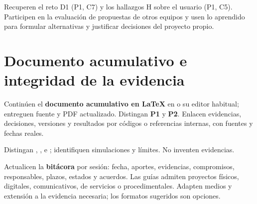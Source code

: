 Recuperen el reto D1 (P1, C7) y los hallazgos H sobre el usuario (P1, C5). Participen en la evaluación de propuestas de otros equipos y usen lo aprendido para formular alternativas y justificar decisiones del proyecto propio.

\section*{Documento acumulativo e integridad de la evidencia}
Continúen el \textbf{documento acumulativo en LaTeX} en  o su editor habitual; entreguen fuente y PDF actualizado. Distingan \textbf{P1} y \textbf{P2}. Enlacen evidencias, decisiones, versiones y resultados por códigos o referencias internas, con fuentes y fechas reales.

Distingan , ,  e ; identifiquen simulaciones y límites.  No inventen evidencias.

Actualicen la \textbf{bitácora} por sesión: fecha, aportes, evidencias, compromisos, responsables, plazos, estados y acuerdos. Las guías admiten proyectos físicos, digitales, comunicativos, de servicios o procedimentales. Adapten medios y extensión a la evidencia necesaria; los formatos sugeridos son opciones.

